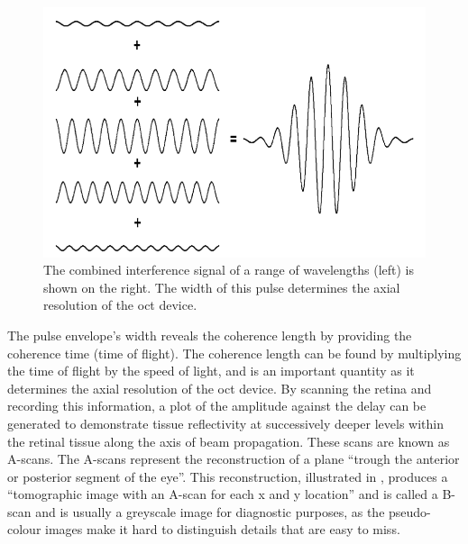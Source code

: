 \begin{figure}[H]
\centering
\includegraphics{figures/morgan_2}
\caption{The combined interference signal of a range of wavelengths (left) is 
shown on the right.  The width of this pulse determines the axial resolution of 
the \Gls{oct} device. \cite{mbib_6} }
\label{fig:m_2}
\end{figure}

The pulse envelope's width reveals the coherence length by providing
the coherence time (time of flight).  The coherence length can be found
by multiplying the time of flight by the speed of light, and is an
important quantity as it determines the axial resolution of the \gls{oct}
device. \cite{mbib_6}  By scanning the retina and recording this
information, a plot of the amplitude against the delay can be generated to
demonstrate tissue reflectivity at successively deeper levels within the
retinal tissue along the axis of beam propagation. \cite{mbib_6}
These scans are known as A-scans.  The A-scans represent the reconstruction
of a plane \enquote{trough the anterior or posterior segment of the eye}.\cite{mbib_6}
This reconstruction, illustrated in , produces a \enquote{tomographic
image with an A-scan for each x and y location} and is called a B-scan and is
usually a greyscale image for diagnostic purposes, as the pseudo-colour images
make it hard to distinguish details that are easy to miss. \cite{mbib_5,mbib_4,mbib_7}


